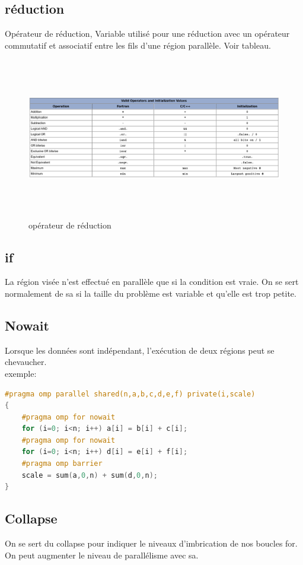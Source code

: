 \documentclass[oneside]{book}
\begin{document}
\subsection{réduction}
Opérateur de réduction, Variable utilisé pour une réduction avec un opérateur commutatif et associatif entre les fils d'une région parallèle. Voir tableau.
\begin{figure}[!ht]
\centering
\includegraphics[height=7cm, width = \linewidth, keepaspectratio]{reduction.png}
\caption{opérateur de réduction}
\label{fig:reduction}
\end{figure}

\subsection{if}
La région visée n'est effectué en parallèle que si la condition est vraie. On se sert normalement de sa si la taille du problème est variable et qu'elle est trop petite.

\subsection{Nowait}
Lorsque les données sont indépendant, l'exécution de deux régions peut se chevaucher.\\
exemple:
\begin{lstlisting}[language=c]
#pragma omp parallel shared(n,a,b,c,d,e,f) private(i,scale)
{
	#pragma omp for nowait
	for (i=0; i<n; i++) a[i] = b[i] + c[i];
	#pragma omp for nowait
	for (i=0; i<n; i++) d[i] = e[i] + f[i];
	#pragma omp barrier
	scale = sum(a,0,n) + sum(d,0,n);
}
\end{lstlisting}

\subsection{Collapse}
On se sert du collapse pour indiquer le niveaux d'imbrication de nos boucles for. On peut augmenter le niveau de parallélisme avec sa.
\end{document}
